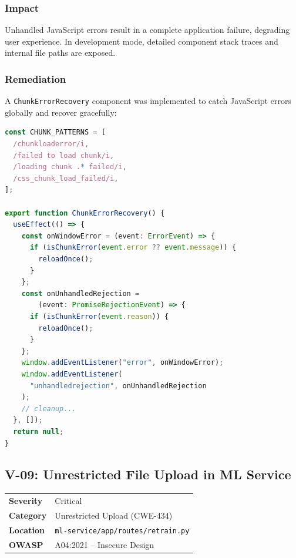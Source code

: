 \documentclass[12pt,a4paper]{article}
\begin{document}
\subsubsection{Impact}

Unhandled JavaScript errors result in a complete application failure, degrading user experience. In development mode, detailed component stack traces and internal file paths are exposed.

\subsubsection{Remediation}

A \texttt{ChunkErrorRecovery} component was implemented to catch JavaScript errors globally and recover gracefully:

\begin{lstlisting}[language=TypeScript, caption={chunk-error-recovery.tsx -- Error recovery}]
const CHUNK_PATTERNS = [
  /chunkloaderror/i,
  /failed to load chunk/i,
  /loading chunk .* failed/i,
  /css_chunk_load_failed/i,
];

export function ChunkErrorRecovery() {
  useEffect(() => {
    const onWindowError = (event: ErrorEvent) => {
      if (isChunkError(event.error ?? event.message)) {
        reloadOnce();
      }
    };
    const onUnhandledRejection =
        (event: PromiseRejectionEvent) => {
      if (isChunkError(event.reason)) {
        reloadOnce();
      }
    };
    window.addEventListener("error", onWindowError);
    window.addEventListener(
      "unhandledrejection", onUnhandledRejection
    );
    // cleanup...
  }, []);
  return null;
}
\end{lstlisting}

\subsection{V-09: Unrestricted File Upload in ML Service}

\begin{table}[H]
\centering
\begin{tabularx}{\textwidth}{lX}
\toprule
\textbf{Severity} & \textcolor{critical}{Critical} \\
\textbf{Category} & Unrestricted Upload (CWE-434) \\
\textbf{Location} & \texttt{ml-service/app/routes/retrain.py} \\
\textbf{OWASP} & A04:2021 -- Insecure Design \\
\bottomrule
\end{tabularx}
\end{table}
\end{document}
